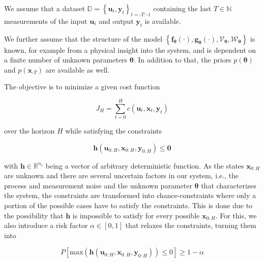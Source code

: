 We assume that a dataset $\mathbb{D} = \left\{\boldsymbol{u}_{t}, \boldsymbol{y}_{t}\right\}_{t = \text{-}T:\text{-}1}$ containing the last $T \in \mathbb{N}$ measurements of the input $\boldsymbol{u}_t$ and output $\boldsymbol{y}_t$ is available.

We further assume that the structure of the model $\left\{\boldsymbol{f}_{\boldsymbol{\theta}}(\cdot), \boldsymbol{g}_{\boldsymbol{\theta}}(\cdot), \boldsymbol{\mathcal{V}}_{\boldsymbol{\theta}}, \boldsymbol{\mathcal{W}}_{\boldsymbol{\theta}}\right\}$ is known, for example from a physical insight into the system, and is dependent on a finite number of unknown parameters $\boldsymbol{\theta}$. In addition to that, the priors $p(\boldsymbol{\theta})$ and $p(\boldsymbol{x}_{\text{-}T})$ are available as well.

The objective is to minimize a given cost function 

\begin{equation} \label{cost function}
J_H = \sum_{t = 0}^H c(\boldsymbol{u}_t,  \boldsymbol{x}_t,  \boldsymbol{y}_t)
\end{equation}

over the horizon $H$ while satisfying the constraints 

\begin{equation} \label{constraints}
\boldsymbol{h}(\boldsymbol{u}_{0:H},  \boldsymbol{x}_{0:H},  \boldsymbol{y}_{0:H}) \leq \boldsymbol{0}
\end{equation}

with $\boldsymbol{h} \in \mathbb{R}^{n_c}$ being a vector of arbitrary deterministic function. As the states $\boldsymbol{x}_{0:H}$ are unknown and there are several uncertain factors in our system, i.e., the process and measurement noise and the unknown parameter $\boldsymbol{\theta}$ that characterizes the system, the constraints are transformed into chance-constraints where only a portion of the possible cases have to satisfy the constraints. This is done due to the possibility that $\boldsymbol{h}$ is impossible to satisfy for every possible $\boldsymbol{x}_{0:H}$. For this, we also introduce a risk factor $\alpha \in [0, 1]$ that relaxes the constraints, turning them into

\begin{equation} \label{risk constraints}
P \left[ \text{max} (\boldsymbol{h}(\boldsymbol{u}_{0:H},  \boldsymbol{x}_{0:H},  \boldsymbol{y}_{0:H})) \leq 0 \right] \geq 1 - \alpha
\end{equation}

